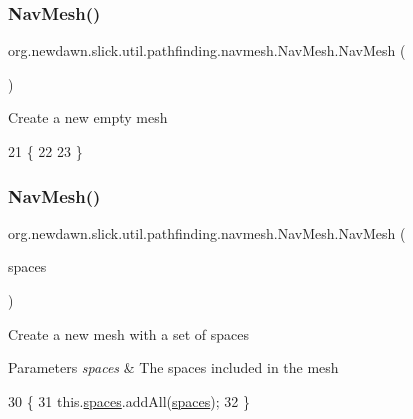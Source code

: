 \subsubsection{\texorpdfstring{Nav\+Mesh()}{NavMesh()}\hspace{0.1cm}{\footnotesize\ttfamily [1/2]}}
{\footnotesize\ttfamily org.\+newdawn.\+slick.\+util.\+pathfinding.\+navmesh.\+Nav\+Mesh.\+Nav\+Mesh (\begin{DoxyParamCaption}{ }\end{DoxyParamCaption})\hspace{0.3cm}{\ttfamily [inline]}}

Create a new empty mesh 
\begin{DoxyCode}
21                      \{
22         
23     \}
\end{DoxyCode}
\mbox{\label{classorg_1_1newdawn_1_1slick_1_1util_1_1pathfinding_1_1navmesh_1_1_nav_mesh_a9d478db4c2c95601f314fdaa46abd06d}} 
\subsubsection{\texorpdfstring{Nav\+Mesh()}{NavMesh()}\hspace{0.1cm}{\footnotesize\ttfamily [2/2]}}
{\footnotesize\ttfamily org.\+newdawn.\+slick.\+util.\+pathfinding.\+navmesh.\+Nav\+Mesh.\+Nav\+Mesh (\begin{DoxyParamCaption}\item[{Array\+List}]{spaces }\end{DoxyParamCaption})\hspace{0.3cm}{\ttfamily [inline]}}

Create a new mesh with a set of spaces


\begin{DoxyParams}{Parameters}
{\em spaces} & The spaces included in the mesh \\
\hline
\end{DoxyParams}

\begin{DoxyCode}
30                                      \{
31         this.\mbox{\hyperlink{classorg_1_1newdawn_1_1slick_1_1util_1_1pathfinding_1_1navmesh_1_1_nav_mesh_a753a5f03305449a3c61d01a41c2fb129}{spaces}}.addAll(\mbox{\hyperlink{classorg_1_1newdawn_1_1slick_1_1util_1_1pathfinding_1_1navmesh_1_1_nav_mesh_a753a5f03305449a3c61d01a41c2fb129}{spaces}});
32     \}
\end{DoxyCode}


